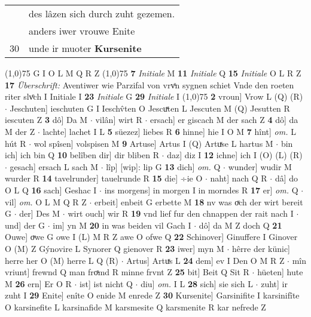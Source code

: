 \documentclass[8pt,a4paper,notitlepage]{article}
\begin{document}
\begin{table}[ht]
\begin{minipage}[t]{0.5\linewidth}
\begin{tabular}{rl}
 & des lâzen sich durch zuht gezemen.\\ 
 & anders iwer vrouwe Enite\\ 
30 & unde ir muoter \textbf{Kursenite}\\ 
\end{tabular}
\scriptsize
\line(1,0){75} \newline
G I O L M Q R Z \newline
\line(1,0){75} \newline
\textbf{7} \textit{Initiale} M  \textbf{11} \textit{Initiale} Q  \textbf{15} \textit{Initiale} O L R Z  \textbf{17} \textit{Überschrift:} Aventiwer wie Parzifal von vrvͦn sygnen schiet Vnde den roeten riter slvͦch I  Initiale I  \textbf{23} \textit{Initiale} G  \textbf{29} \textit{Initiale} I  \newline
\line(1,0){75} \newline
\textbf{2} vroun] Vrow L (Q) (R)  $\cdot$ Jeschuten] ieschuten G I Ieschv̂ten O Jescuͯten L Jescuten M (Q) Jesutten R iescuten Z \textbf{3} dô] Da M  $\cdot$ vilân] wirt R  $\cdot$ ersach] er giscach M der sach Z \textbf{4} dô] da M der Z  $\cdot$ lachte] lachet I L \textbf{5} süezez] liebes R \textbf{6} hinne] hie I O M \textbf{7} hînt] \textit{om.} L hút R  $\cdot$ wol spîsen] volspisen M \textbf{9} Artuse] Artus I (Q) Artuͯse L hartus M  $\cdot$ bin ich] ich bin Q \textbf{10} belîben dir] dir bliben R  $\cdot$ daz] diz I \textbf{12} ichne] ich I (O) (L) (R)  $\cdot$ gesach] ersach L sach M  $\cdot$ lîp] [wip]: lip G \textbf{13} dich] \textit{om.} Q  $\cdot$ wunder] wudir M wurder R \textbf{14} tavelrunder] tauelrunde R \textbf{15} die] ÷ie O  $\cdot$ naht] nach Q R  $\cdot$ dâ] do O L Q \textbf{16} sach] Geshac I  $\cdot$ ins morgens] in morgen I in morndes R \textbf{17} er] \textit{om.} Q  $\cdot$ vil] \textit{om.} O L M Q R Z  $\cdot$ erbeit] enbeit G erbette M \textbf{18} nv was oͮch der wirt bereit G  $\cdot$ der] Des M  $\cdot$ wirt ouch] wir R \textbf{19} vnd lief fur den chnappen der rait nach I  $\cdot$ und] der G  $\cdot$ im] yn M \textbf{20} in was beiden vil Gach I  $\cdot$ dô] da M Z doch Q \textbf{21} Ouwe] oͮwe G owe I (L) M R Z awe O ofwe Q \textbf{22} Schinover] Ginuffere I Ginover O (M) Z Gýnovire L Synorer Q gienover R \textbf{23} iwer] myn M  $\cdot$ hêrre der künic] herre her O (M) herre L Q (R)  $\cdot$ Artus] Artuͯs L \textbf{24} dem] ev I Den O M R Z  $\cdot$ mîn vriunt] frewnd Q man froͯmd R minne frvnt Z \textbf{25} bit] Beit Q Sit R  $\cdot$ hüeten] hute M \textbf{26} ern] Er O R  $\cdot$ ist] ist nicht Q  $\cdot$ diu] \textit{om.} I L \textbf{28} sich] sie sich L  $\cdot$ zuht] ir zuht I \textbf{29} Enite] enîte O enide M enrede Z \textbf{30} Kursenite] Garsinifite I karsinifîte O karsinefite L karsinafide M karsmesite Q karsmenite R kar nefrede Z \newline

\end{minipage}
\end{table}
\end{document}
